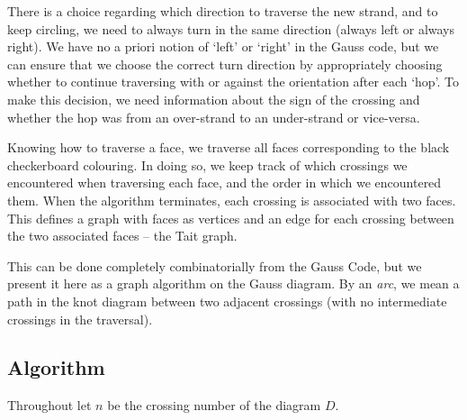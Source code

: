 \documentclass[12pt]{report}
\theoremstyle{upright}
\begin{document}
There is a choice regarding which direction to traverse the new strand, and to keep circling, we need to always turn in the same direction (always left or always right). We have no a priori notion of `left' or `right' in the Gauss code, but we can ensure that we choose the correct turn direction by appropriately choosing whether to continue traversing with or against the orientation after each `hop'. To make this decision, we need information about the sign of the crossing and whether the hop was from an over-strand to an under-strand or vice-versa.

Knowing how to traverse a face, we traverse all faces corresponding to the black checkerboard colouring. In doing so, we keep track of which crossings we encountered when traversing each face, and the order in which we encountered them. When the algorithm terminates, each crossing is associated with two faces. This defines a graph with faces as vertices and an edge for each crossing between the two associated faces -- the Tait graph.

This can be done completely combinatorially from the Gauss Code, but we present it here as a graph algorithm on the Gauss diagram. By an \textit{arc}, we mean a path in the knot diagram between two adjacent crossings (with no intermediate crossings in the traversal).

\subsection*{Algorithm}

Throughout let $n$ be the crossing number of the diagram $D$.
\end{document}
